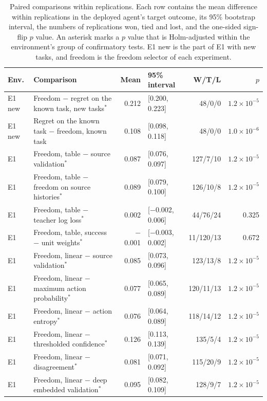 \begin{table}[t]
\centering
\caption{Paired comparisons within replications. Each row contains the mean difference within replications in the deployed agent's target outcome, its 95\% bootstrap interval, the numbers of replications won, tied and lost, and the one-sided sign-flip $p$ value. An asterisk marks a $p$ value that is Holm-adjusted within the environment's group of confirmatory tests. E1 new is the part of E1 with new tasks, and freedom is the freedom selector of each experiment.}
\label{tab:paired}
\footnotesize
\setlength{\tabcolsep}{4pt}
\begin{tabular}{@{}l>{\raggedright\arraybackslash}p{6.4cm}rlrr@{}}
\toprule
Env. & Comparison & Mean & 95\% interval & W/T/L & $p$ \\
\midrule
E1 new & Freedom $-$ regret on the known task, new tasks$^*$ & 0.212 & [0.200, 0.223] & 48/0/0 & $1.2\times10^{-5}$ \\
E1 new & Regret on the known task $-$ freedom, known task & 0.108 & [0.098, 0.118] & 48/0/0 & $1.0\times10^{-6}$ \\
E1 & Freedom, table $-$ source validation$^*$ & 0.087 & [0.076, 0.097] & 127/7/10 & $1.2\times10^{-5}$ \\
E1 & Freedom, table $-$ freedom on source histories$^*$ & 0.089 & [0.079, 0.100] & 126/10/8 & $1.2\times10^{-5}$ \\
E1 & Freedom, table $-$ teacher log loss$^*$ & 0.002 & [$-$0.002, 0.006] & 44/76/24 & 0.325 \\
E1 & Freedom, table, success $-$ unit weights$^*$ & $-$0.001 & [$-$0.003, 0.002] & 11/120/13 & 0.672 \\
E1 & Freedom, linear $-$ source validation$^*$ & 0.085 & [0.073, 0.096] & 123/13/8 & $1.2\times10^{-5}$ \\
E1 & Freedom, linear $-$ maximum action probability$^*$ & 0.077 & [0.065, 0.089] & 120/11/13 & $1.2\times10^{-5}$ \\
E1 & Freedom, linear $-$ action entropy$^*$ & 0.076 & [0.064, 0.089] & 118/14/12 & $1.2\times10^{-5}$ \\
E1 & Freedom, linear $-$ thresholded confidence$^*$ & 0.126 & [0.113, 0.139] & 135/5/4 & $1.2\times10^{-5}$ \\
E1 & Freedom, linear $-$ disagreement$^*$ & 0.081 & [0.071, 0.092] & 115/20/9 & $1.2\times10^{-5}$ \\
E1 & Freedom, linear $-$ deep embedded validation$^*$ & 0.095 & [0.082, 0.109] & 128/9/7 & $1.2\times10^{-5}$ \\

\end{tabular}
\end{table}

